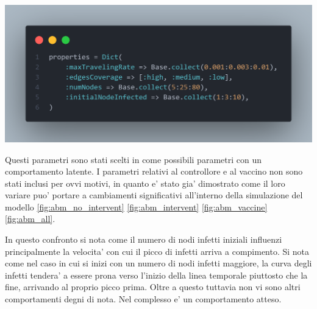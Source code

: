 \begin{minipage}{\linewidth}
	\centering
	\includegraphics[width=\textwidth]{img/paramscan.png}
	\label{fig:paramscan}
\end{minipage}

Questi parametri sono stati scelti in come possibili parametri con un comportamento latente. I parametri 
relativi al controllore e al vaccino non sono stati inclusi per ovvi motivi, in quanto e' stato gia' dimostrato 
come il loro variare puo' portare a cambiamenti significativi all'interno della simulazione del modello 
\ref{fig:abm_no_intervent} \ref{fig:abm_intervent} \ref{fig:abm_vaccine} \ref{fig:abm_all}.

\newpage

In questo confronto si nota come il numero di nodi infetti iniziali influenzi principalmente la velocita' con cui 
il picco di infetti arriva a compimento. Si nota come nel caso in cui si inizi con un numero di nodi infetti maggiore, 
la curva degli infetti tendera' a essere prona verso l'inizio della linea temporale piuttosto che la fine, arrivando 
al proprio picco prima. Oltre a questo tuttavia non vi sono altri comportamenti degni di nota. Nel complesso e' un
comportamento atteso.

